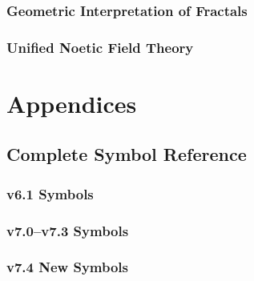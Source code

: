 \documentclass[11pt,twoside,openright]{book}
\theoremstyle{definition}
\theoremstyle{plain}
\theoremstyle{remark}
\begin{document}
\section{Geometric Interpretation of Fractals}

\section{Unified Noetic Field Theory}

\part{Appendices}
\label{part:appendices}

\chapter{Complete Symbol Reference}
\label{ch:symbol-reference}

\section{v6.1 Symbols}

\section{v7.0--v7.3 Symbols}

\section{v7.4 New Symbols}
\end{document}
